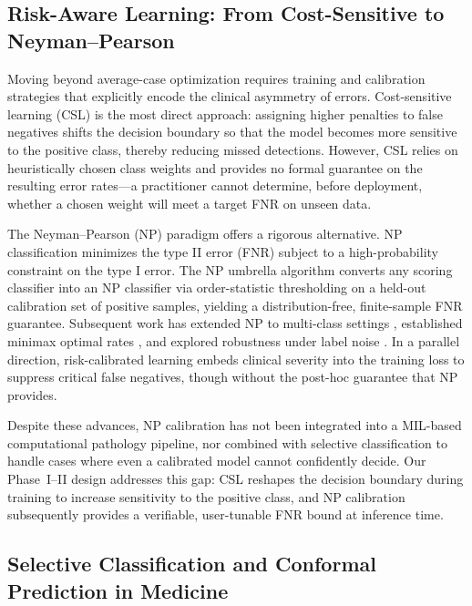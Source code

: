 \subsection{Risk-Aware Learning: From Cost-Sensitive to Neyman--Pearson}

Moving beyond average-case optimization requires training and calibration
strategies that explicitly encode the clinical asymmetry of errors.
Cost-sensitive learning (CSL) \cite{el2010foundations,he2009learning} is the
most direct approach: assigning higher penalties to false negatives shifts
the decision boundary so that the model becomes more sensitive to the
positive class, thereby reducing missed detections. However, CSL relies on
heuristically chosen class weights and provides no formal guarantee on the
resulting error rates---a practitioner cannot determine, before deployment,
whether a chosen weight will meet a target FNR on unseen data.

The Neyman--Pearson (NP) paradigm offers a rigorous alternative. NP
classification \cite{rigollet2011neyman} minimizes the type II error (FNR)
subject to a high-probability constraint on the type I error. The NP
umbrella algorithm \cite{tong2018neyman} converts any scoring classifier
into an NP classifier via order-statistic thresholding on a held-out
calibration set of positive samples, yielding a distribution-free,
finite-sample FNR guarantee. Subsequent work has extended NP to multi-class
settings \cite{tian2025neyman}, established minimax optimal rates
\cite{kalan2024distribution}, and explored robustness under label noise
\cite{yao2023asymmetric}. In a parallel direction, risk-calibrated learning
\cite{riskcalibrated2026} embeds clinical severity into the training loss to
suppress critical false negatives, though without the post-hoc guarantee
that NP provides.

Despite these advances, NP calibration has not been integrated into a
MIL-based computational pathology pipeline, nor combined with selective
classification to handle cases where even a calibrated model cannot
confidently decide. Our Phase~I--II design addresses this gap: CSL reshapes
the decision boundary during training to increase sensitivity to the
positive class, and NP calibration subsequently provides a verifiable,
user-tunable FNR bound at inference time.


\subsection{Selective Classification and Conformal Prediction in Medicine}


